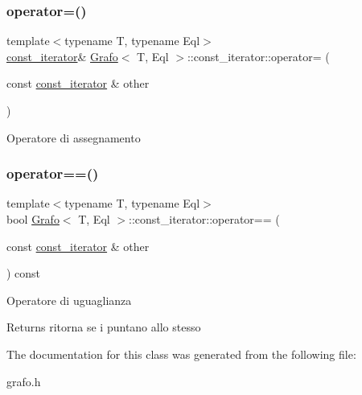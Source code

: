 \subsubsection{\texorpdfstring{operator=()}{operator=()}}
{\footnotesize\ttfamily template$<$typename T, typename Eql$>$ \\
\hyperlink{classGrafo_1_1const__iterator}{const\+\_\+iterator}\& \hyperlink{classGrafo}{Grafo}$<$ T, Eql $>$\+::const\+\_\+iterator\+::operator= (\begin{DoxyParamCaption}\item[{const \hyperlink{classGrafo_1_1const__iterator}{const\+\_\+iterator} \&}]{other }\end{DoxyParamCaption})\hspace{0.3cm}{\ttfamily [inline]}}

Operatore di assegnamento \mbox{\label{classGrafo_1_1const__iterator_ac035050bf14134f1587cb0d047bac405}} 
\subsubsection{\texorpdfstring{operator==()}{operator==()}}
{\footnotesize\ttfamily template$<$typename T, typename Eql$>$ \\
bool \hyperlink{classGrafo}{Grafo}$<$ T, Eql $>$\+::const\+\_\+iterator\+::operator== (\begin{DoxyParamCaption}\item[{const \hyperlink{classGrafo_1_1const__iterator}{const\+\_\+iterator} \&}]{other }\end{DoxyParamCaption}) const\hspace{0.3cm}{\ttfamily [inline]}}

Operatore di uguaglianza \begin{DoxyReturn}{Returns}
ritorna se i puntano allo stesso 
\end{DoxyReturn}


The documentation for this class was generated from the following file\+:\begin{DoxyCompactItemize}
\item 
grafo.\+h\end{DoxyCompactItemize}
